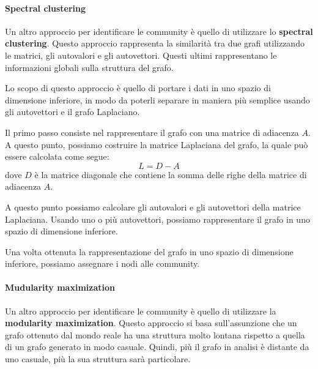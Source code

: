\paragraph{Spectral clustering}
Un altro approccio per identificare le community è quello di utilizzare lo
\textbf{spectral clustering}. Questo approccio rappresenta la similarità tra due
grafi utilizzando le matrici, gli autovalori e gli autovettori. Questi ultimi
rappresentano le informazioni globali sulla struttura del grafo.

Lo scopo di questo approccio è quello di portare i dati in uno spazio di dimensione
inferiore, in modo da poterli separare in maniera più semplice usando gli autovettori
e il grafo Laplaciano.

Il primo passo consiste nel rappresentare il grafo con una matrice di adiacenza
$A$. A questo punto, possiamo costruire la matrice Laplaciana del grafo, la quale
può essere calcolata come segue:
\begin{equation}
    L = D - A
\end{equation}
dove $D$ è la matrice diagonale che contiene la somma delle righe della matrice
di adiacenza $A$.

A questo punto possiamo calcolare gli autovalori e gli autovettori della matrice
Laplaciana. Usando uno o più autovettori, possiamo rappresentare il grafo in uno
spazio di dimensione inferiore.

Una volta ottenuta la rappresentazione del grafo in uno spazio di dimensione
inferiore, possiamo assegnare i nodi alle community.
\paragraph{Mudularity maximization}
Un altro approccio per identificare le community è quello di utilizzare la
\textbf{modularity maximization}. Questo approccio si basa sull'assunzione che
un grafo ottenuto dal mondo reale ha una struttura molto lontana rispetto a
quella di un grafo generato in modo casuale. Quindi, più il grafo in analisi è
distante da uno casuale, più la sua struttura sarà particolare.

